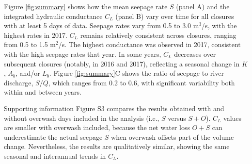 \documentclass[preprint,12pt,authoryear]{elsarticle}
\begin{document}
Figure \ref{fig:summary} shows how the mean seepage rate $S$  (panel A) and the integrated hydraulic conductance $C_L$ (panel B) vary over time for all closures with  at least 5 days of data. Seepage rates vary from 0.5 to 3.0 m$^3$/s, with the highest rates in 2017. $C_L$ remains relatively consistent across closures, ranging from 0.5 to 1.5 m$^2$/s. The highest conductance was observed in 2017, consistent with the  high seepage rates that year. In some years, $C_L$ decreases over subsequent closures (notably, in 2016 and 2017), reflecting a seasonal change in $K$, $A_b$, and/or $L_b$. 
Figure \ref{fig:summary}C shows the ratio of seepage to river discharge, $S/Q$, which ranges from 0.2 to 0.6, with significant variability both within and between years.



Supporting information Figure S3 compares the results obtained with and without overwash days included in the analysis (i.e., $S$ versus $S + O$). $C_L$ values are smaller with overwash included, because the net water loss $O + S$ can underestimate the actual seepage $S$ when overwash offsets part of the volume change.
Nevertheless, the results are qualitatively similar, showing the same seasonal and interannual trends in $C_L$.
\end{document}
